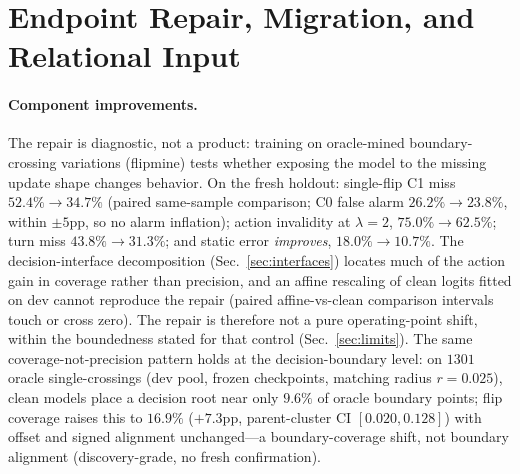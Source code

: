 \section{Endpoint Repair, Migration, and Relational Input}
\label{sec:repair}

\paragraph{Component improvements.} The repair is diagnostic, not a
product: training on oracle-mined boundary-crossing variations (flipmine)
tests whether exposing the model to the missing update shape changes
behavior. On the fresh holdout: single-flip C1 miss $52.4\% \to 34.7\%$
(paired same-sample comparison; C0 false alarm $26.2\% \to 23.8\%$, within
$\pm 5$pp, so no alarm inflation); action invalidity at $\lambda{=}2$,
$75.0\% \to 62.5\%$; turn miss $43.8\% \to 31.3\%$; and static error
\emph{improves}, $18.0\% \to 10.7\%$. The decision-interface decomposition
(Sec.~\ref{sec:interfaces}) locates much of the action gain in coverage
rather than precision, and an affine rescaling of clean logits fitted on
dev cannot reproduce the repair (paired affine-vs-clean comparison
intervals touch or cross zero). The repair is therefore not a pure
operating-point shift, within the boundedness stated for that control
(Sec.~\ref{sec:limits}). The same coverage-not-precision pattern holds at
the decision-boundary level: on $1301$ oracle single-crossings (dev pool,
frozen checkpoints, matching radius $r{=}0.025$), clean models place a
decision root near only $9.6\%$ of oracle boundary points; flip coverage
raises this to $16.9\%$ ($+7.3$pp, parent-cluster CI $[0.020,0.128]$) with
offset and signed alignment unchanged---a boundary-coverage shift, not
boundary alignment (discovery-grade, no fresh confirmation).


